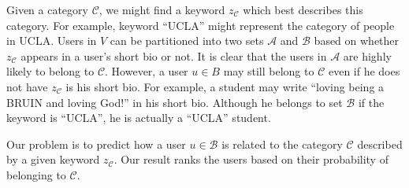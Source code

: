 \documentclass{article}
\begin{document}
Given a category $\mathcal{C}$, we might find a keyword $z_{\mathcal{C}}$ which best describes this category. For example, keyword ``UCLA'' might represent the category of people in UCLA. Users in $V$ can be partitioned into two sets $\mathcal{A}$ and $\mathcal{B}$ based on whether $z_{\mathcal{C}}$ appears in a user's short bio or not. It is clear that the users in $\mathcal{A}$ are highly likely to belong to $\mathcal{C}$. However, a user $u \in B$ may still belong to $\mathcal{C}$ even if he does not have $z_{\mathcal{C}}$ is his short bio. For example, a student may write ``loving being a BRUIN and loving God!'' in his short bio. Although he belongs to set $\mathcal{B}$ if the keyword is ``UCLA'', he is actually a ``UCLA'' student.

Our problem is to predict how a user $u \in \mathcal{B}$ is related to the category $\mathcal{C}$ described by a given keyword $z_{\mathcal{C}}$. Our result ranks the users based on their probability of belonging to $\mathcal{C}$.


\ifx \allfiles \undefined
\end{document}
